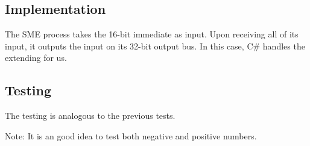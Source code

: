 \documentclass{beamer}
\begin{document}
\subsection{Implementation}
\begin{frame}
    The SME process takes the 16-bit immediate as input. Upon receiving all of
    its input, it outputs the input on its 32-bit output bus. In this case, C\#
    handles the extending for us.
\end{frame}
\subsection{Testing}
\begin{frame}
    The testing is analogous to the previous tests.

    \vspace{\baselineskip}
    Note: It is an good idea to test both negative and positive numbers.
\end{frame}
\end{document}
